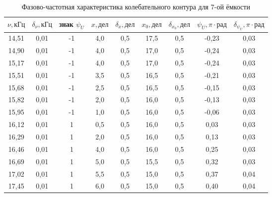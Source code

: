 \documentclass[a4paper, 12pt]{article}
\begin{document}
\begin{table}[h!]
\begin{center}
\begin{tabular}{|c|c|c|c|c|c|c|c|c|}
\hline
$\nu, кГц$ & $\delta_{\nu}, кГц$ & знак $\psi_U$ & $x, дел$ & $\delta_x, дел$ & $x_0, дел$ & $\delta_{x_0}, дел$ & $\psi_U, \pi \cdot рад$ & $\delta_{\psi_U}, \pi \cdot рад$ \\ \hline
14,51  & 0,01    & -1         & 4,0    & 0,5     & 17,5    & 0,5      & -0,23        & 0,03           \\ \hline
14,90  & 0,01    & -1         & 4,0    & 0,5     & 17,0    & 0,5      & -0,24        & 0,03           \\ \hline
15,17  & 0,01    & -1         & 4,0    & 0,5     & 17,0    & 0,5      & -0,24        & 0,03           \\ \hline
15,51  & 0,01    & -1         & 3,5    & 0,5     & 16,5    & 0,5      & -0,21        & 0,03           \\ \hline
15,68  & 0,01    & -1         & 2,5    & 0,5     & 16,5    & 0,5      & -0,15        & 0,03           \\ \hline
15,82  & 0,01    & -1         & 2,0    & 0,5     & 16,0    & 0,5      & -0,13        & 0,03           \\ \hline
15,95  & 0,01    & -1         & 1,0    & 0,5     & 16,0    & 0,5      & -0,06        & 0,03           \\ \hline
16,12  & 0,01    & 1          & 0,5    & 0,5     & 16,0    & 0,5      & 0,03         & 0,03            \\ \hline
16,29  & 0,01    & 1          & 2,0    & 0,5     & 16,0    & 0,5      & 0,13         & 0,03            \\ \hline
16,46  & 0,01    & 1          & 4,0    & 0,5     & 16,0    & 0,5      & 0,25         & 0,03            \\ \hline
16,69  & 0,01    & 1          & 5,0    & 0,5     & 15,5    & 0,5      & 0,32         & 0,03            \\ \hline
17,02  & 0,01    & 1          & 5,5    & 0,5     & 15,0    & 0,5      & 0,37         & 0,04            \\ \hline
17,45  & 0,01    & 1          & 6,0    & 0,5     & 15,0    & 0,5      & 0,40         & 0,04            \\ \hline
\end{tabular}
\end{center}
\caption{Фазово-частотная характеристика колебательного контура для 7-ой ёмкости}
\label{tab5}
\end{table}
\end{document}
